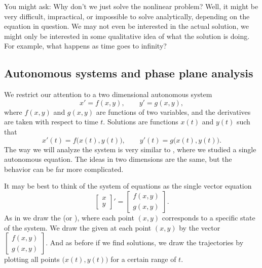 You might ask: Why don't we just solve the nonlinear problem?  Well, it
might be very difficult, impractical, or impossible to solve analytically,
depending on the equation in question.  We may
not even be interested in the actual solution, we might only be interested
in some qualitative idea of what the solution is doing.  For example,
what happens as time goes to infinity?

\subsection{Autonomous systems and phase plane analysis}

We restrict our attention to a two dimensional autonomous system
\begin{equation*}
x' = f(x,y) , \qquad y' = g(x,y) ,
\end{equation*}
where $f(x,y)$ and $g(x,y)$ are functions of two variables, and the
derivatives are taken with respect to time $t$.  Solutions are
functions $x(t)$ and $y(t)$ such that
\begin{equation*}
x'(t) = f\bigl(x(t),y(t)\bigr), \qquad
y'(t) = g\bigl(x(t),y(t)\bigr) .
\end{equation*}
The way we will analyze the system is very similar to
, where we studied a single autonomous equation.  The
ideas in two dimensions are the same, but the behavior can be
far more complicated.

It may be best to think of the system of equations as the single vector equation
\begin{equation} \label{eq:nlinautn2}
\begin{bmatrix} x \\ y \end{bmatrix} ' =
\begin{bmatrix} f(x,y) \\ g(x,y) \end{bmatrix} .
\end{equation}
As in  we draw
the \emph{} (or \emph{}),
where each point $(x,y)$ corresponds to a specific state of the system.
We draw the \emph{}
given at each
point $(x,y)$ by the vector
$\left[ \begin{smallmatrix} f(x,y) \\ g(x,y) \end{smallmatrix} \right]$.
And as before if we find solutions, we draw the trajectories
by plotting all points $\bigl(x(t),y(t)\bigr)$ for a certain range of $t$.

